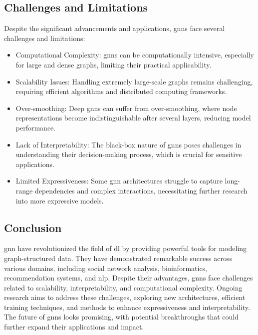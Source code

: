 \subsection*{Challenges and Limitations}

Despite the significant advancements and applications, \glspl{gnn} face several challenges and limitations:
\begin{itemize}
    \item Computational Complexity: \glspl{gnn} can be computationally intensive, especially for large and dense graphs, limiting their practical applicability.
    \item Scalability Issues: Handling extremely large-scale graphs remains challenging, requiring efficient algorithms and distributed computing frameworks.
    \item Over-smoothing: Deep \glspl{gnn} can suffer from over-smoothing, where node representations become indistinguishable after several layers, reducing model performance.
    \item Lack of Interpretability: The black-box nature of \glspl{gnn} poses challenges in understanding their decision-making process, which is crucial for sensitive applications.
    \item Limited Expressiveness: Some \gls{gnn} architectures struggle to capture long-range dependencies and complex interactions, necessitating further research into more expressive models.
\end{itemize}

\subsection*{Conclusion}

\acrlong{gnn} have revolutionized the field of \acrlong{dl} by providing powerful tools for modeling graph-structured data. They have demonstrated remarkable success across various domains, including social network analysis, bioinformatics, recommendation systems, and \gls{nlp}. Despite their advantages, \glspl{gnn} face challenges related to scalability, interpretability, and computational complexity. Ongoing research aims to address these challenges, exploring new architectures, efficient training techniques, and methods to enhance expressiveness and interpretability. The future of \glspl{gnn} looks promising, with potential breakthroughs that could further expand their applications and impact.
